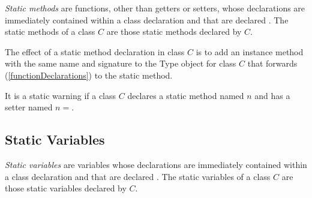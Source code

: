 \documentclass{article}
\newcommand{\code}[1]{{\sf #1}}
\begin{document}
\LMHash{}
{\em Static methods} are functions, other than getters or setters, whose declarations are immediately contained within a class declaration and that are declared \STATIC{}. The static methods of a class $C$ are those static methods declared by $C$.

\LMHash{}
The effect of a static method declaration in class $C$ is to add an instance method with the same name and signature to the \code{Type} object for class $C$ that forwards (\ref{functionDeclarations})  to the static method.


\LMHash{}
It is a static warning if a class $C$ declares a static method named $n$ and has a setter named $n=$. 



\subsection{Static Variables}

\LMHash{}
{\em Static variables} are variables whose declarations are immediately contained within a class declaration and that are declared \STATIC{}. The static variables of a class $C$ are those static variables declared by $C$.

\end{document}
